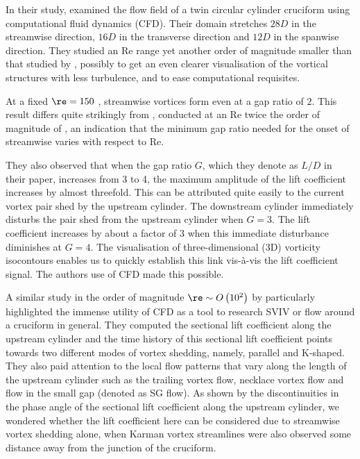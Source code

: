 \documentclass[a4paper,fleqn]{cas-sc}
\begin{document}
In their study, \citet{Deng2007} examined the flow field of a twin circular cylinder cruciform using computational fluid dynamics (CFD). Their domain stretches  $28D$  in the streamwise direction,  $16D$  in the transverse direction and  $12D$  in the spanwise direction. They studied an Re range yet another order of magnitude smaller than that studied by \citet{Koide2017}, possibly to get an even clearer visualisation of the vortical structures with less turbulence, and to ease computational requisites.

At a fixed  $\re = 150$ , streamwise vortices form even at a gap ratio of $2$. This result differs quite strikingly from \citet{Koide2006,Koide2007}, conducted at an Re twice the order of magnitude of \citet{Deng2007}, an indication that the minimum gap ratio needed for the onset of streamwise varies with respect to Re.

They also observed that when the gap ratio $G$, which they denote as  $L/D$  in their paper, increases from 3 to 4, the maximum amplitude of the lift coefficient increases by almost threefold. This can be attributed quite easily to the current vortex pair shed by the upstream cylinder. The downstream cylinder immediately disturbs the pair shed from the upstream cylinder when  $G=3$. The lift coefficient increases by about a factor of 3 when this immediate disturbance diminishes at  $G=4$. The visualisation of three-dimensional (3D) vorticity isocontours enables us to quickly establish this link vis-\`{a}-vis the lift coefficient signal. The authors use of CFD made this possible.

A similar study in the order of magnitude $\re \sim O \left( 10^{2} \right)$ by \citet{Zhao2018a} particularly highlighted the immense utility of CFD as a tool to research SVIV or flow around a cruciform in general. They computed the sectional lift coefficient along the upstream cylinder and the time history of this sectional lift coefficient points towards two different modes of vortex shedding, namely, parallel and K-shaped. They also paid attention to the local flow patterns that vary along the length of the upstream cylinder such as the trailing vortex flow, necklace vortex flow and flow in the small gap (denoted as SG flow). As shown by the discontinuities in the phase angle of the sectional lift coefficient along the upstream cylinder, we wondered whether the lift coefficient here can be considered due to streamwise vortex shedding alone, when Karman vortex streamlines were also observed some distance away from the junction of the cruciform.
\end{document}
